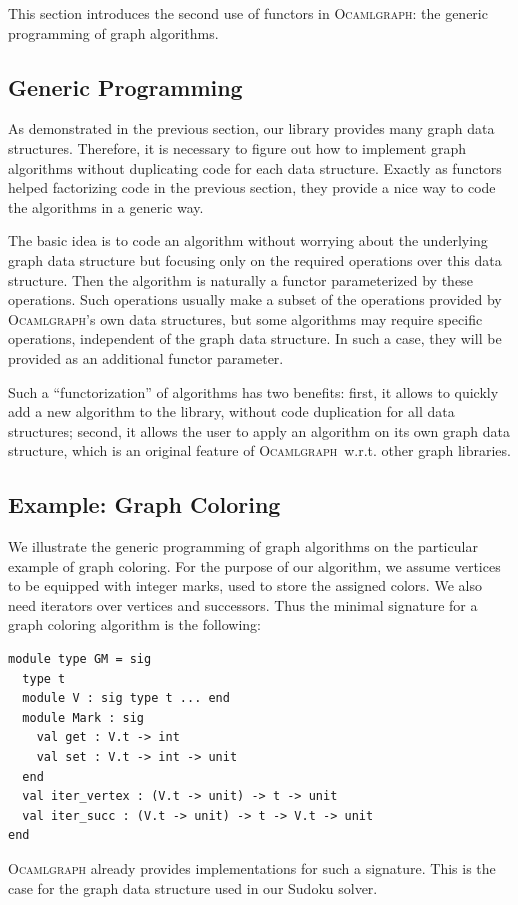 \documentclass[tfpsymp]{tfp05symp}
\newcommand{\ocamlgraph}{\textsc{Ocamlgraph}\xspace}
\begin{document}
This section introduces the second use of functors in \ocamlgraph: the
generic programming of graph algorithms.

\subsection{Generic Programming}

As demonstrated in the previous section, our library provides many
graph data structures. Therefore, it is necessary to figure out how to
implement graph algorithms without duplicating code for each data
structure. Exactly as functors helped factorizing code in the previous
section, they provide a nice way to code the algorithms in a generic
way.

The basic idea is to code an algorithm without worrying about the
underlying graph data structure but focusing only on the required
operations over this data structure. Then the algorithm is naturally a
functor parameterized by these operations. Such operations usually
make a subset of the operations provided by \ocamlgraph's own data
structures, but some algorithms may require specific operations,
independent of the graph data structure. In such a case, they will be
provided as an additional functor parameter.

Such a ``functorization'' of algorithms has two benefits: first, it
allows to quickly add a new algorithm to the library, without code
duplication for all data structures; second, it allows the user to
apply an algorithm on its own graph data structure, which is an
original feature of \ocamlgraph\ w.r.t. other graph libraries.

\subsection{Example: Graph Coloring}
\label{coloring}

We illustrate the generic programming of graph algorithms on the
particular example of graph coloring.  For the purpose of our
algorithm, we assume vertices to be equipped with integer marks, used
to store the assigned colors. We also need iterators over vertices and
successors. Thus the minimal signature for a graph
coloring algorithm is the following:
\begin{verbatim}
module type GM = sig
  type t
  module V : sig type t ... end
  module Mark : sig
    val get : V.t -> int
    val set : V.t -> int -> unit
  end
  val iter_vertex : (V.t -> unit) -> t -> unit
  val iter_succ : (V.t -> unit) -> t -> V.t -> unit
end
\end{verbatim}
\ocamlgraph already provides implementations for such a
signature. This is the case for the graph data structure used in our
Sudoku solver.
\end{document}
